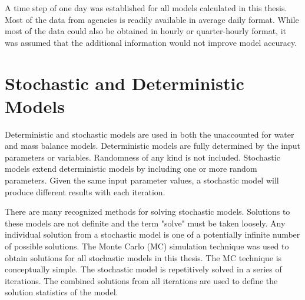 \begin{linenumbers}
A time step of one day was established for all models calculated in this thesis.  Most of the data from agencies is readily available in average daily format.  While most of the data could also be obtained in hourly or quarter-hourly format, it was assumed that the additional information would not improve model accuracy.

\clearpage{}
\section{Stochastic and Deterministic Models}
\label{sec:StochAndDetermModels}

Deterministic and stochastic models are used in both the unaccounted for water and mass balance models.  Deterministic models are fully determined by the input parameters or variables.  Randomness of any kind is not included.  Stochastic models extend deterministic models by including one or more random parameters.  Given the same input parameter values, a stochastic model will produce different results with each iteration.

There are many recognized methods for solving stochastic models.  Solutions to these models are not definite and the term "solve" must be taken loosely.  Any individual solution from a stochastic model is one of a potentially infinite number of possible solutions.  The Monte Carlo (MC) simulation technique was used to obtain solutions for all stochastic models in this thesis.  The MC technique is conceptually simple.  The stochastic model is repetitively solved in a series of iterations.  The combined solutions from all iterations are used to define the solution statistics of the model.  


\end{linenumbers}
